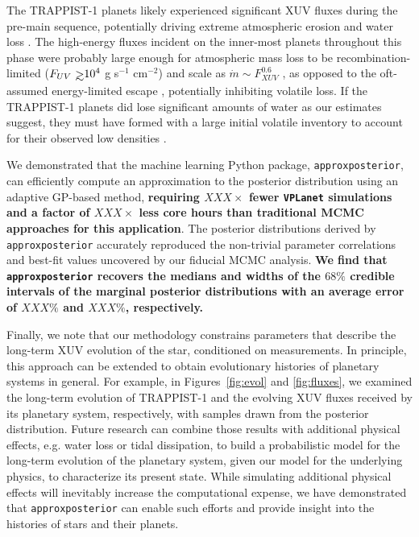 \documentclass[twocolumn]{aastex62}
\def\gsim{~\rlap{$>$}{\lower 1.0ex\hbox{$\sim$}}}
\newcommand{\xxx}[1]{{\textbf{#1}}}
\newcommand{\vplanet}[0]{\texttt{VPLanet}\xspace}
\newcommand{\approxposterior}[0]{\texttt{approxposterior}\xspace}
\begin{document}
The TRAPPIST-1 planets likely experienced significant XUV fluxes during the pre-main sequence, potentially driving extreme atmospheric erosion and water loss \citep{Bolmont2017,Bourrier2017a}. The high-energy fluxes incident on the inner-most planets throughout this phase were probably large enough for atmospheric mass loss to be recombination-limited ($F_{UV} \gsim 10^4$ g s$^{-1}$ cm$^{-2}$) and scale as $\dot{m} \sim F_{XUV}^{0.6}$ \citep{MurrayClay2009}, as opposed to the oft-assumed energy-limited escape \citep[$\dot{m} \sim F_{XUV}$,][]{Watson1981,Lammer2003}, potentially inhibiting volatile loss. If the TRAPPIST-1 planets did lose significant amounts of water as our estimates suggest, they must have formed with a large initial volatile inventory to account for their observed low densities \citep{Grimm2018}.

We demonstrated that the machine learning Python package, \approxposterior \citep{FlemingVanderPlas2018}, can efficiently compute an approximation to the posterior distribution using an adaptive GP-based method, \xxx{requiring $XXX\times$ fewer \vplanet simulations and a factor of $XXX\times$ less core hours than traditional MCMC approaches for this application}. The posterior distributions derived by \approxposterior accurately reproduced the non-trivial parameter correlations and best-fit values uncovered by our fiducial MCMC analysis. \xxx{We find that \approxposterior recovers the medians and widths of the $68\%$ credible intervals of the marginal posterior distributions with an average error of $XXX\%$ and $XXX\%$, respectively.}  

Finally, we note that our methodology constrains parameters that describe the long-term XUV evolution of the star, conditioned on measurements. In principle, this approach can be extended to obtain evolutionary histories of planetary systems in general.  For example, in Figures~\ref{fig:evol} and \ref{fig:fluxes}, we examined the long-term evolution of TRAPPIST-1 and the evolving XUV fluxes received by its planetary system, respectively, with samples drawn from the posterior distribution. Future research can combine those results with additional physical effects, e.g. water loss or tidal dissipation, to build a probabilistic model for the long-term evolution of the planetary system, given our model for the underlying physics, to characterize its present state. While simulating additional physical effects will inevitably increase the computational expense, we have demonstrated that \approxposterior can enable such efforts and provide insight into the histories of stars and their planets.
\end{document}
